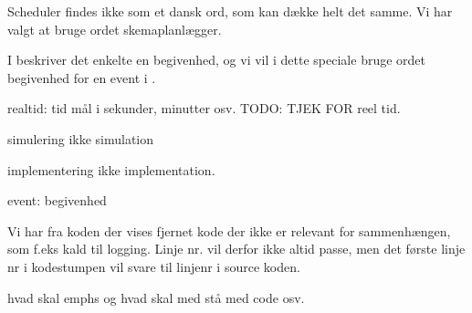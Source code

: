 \begin{list}{}{}

\item Scheduler findes ikke som et dansk ord, som kan  dække helt det samme. Vi har valgt at bruge ordet skemaplanlægger.
\item I \des beskriver det enkelte  en begivenhed, og vi vil i dette speciale bruge ordet begivenhed for en event i \des. 
\item realtid: tid mål i sekunder, minutter osv. TODO: TJEK FOR reel tid.
\item simulering ikke simulation
\item implementering ikke implementation.
\item event: begivenhed
\item Vi har fra koden der vises fjernet kode der ikke er relevant for sammenhængen, som f.eks kald til logging. Linje nr. vil derfor ikke altid passe, men det første linje nr i kodestumpen vil svare til linjenr i source koden.
\item hvad skal emphs og hvad skal med stå med code osv.
\end{list}


